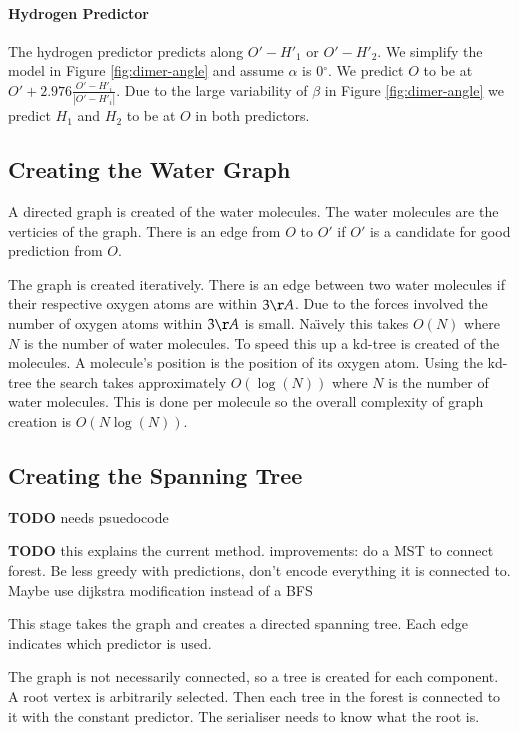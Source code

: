 \documentclass{report}
\newcommand{\degree}{\ensuremath{^\circ}}
\newcommand{\todo}{\textbf{TODO} }
\begin{document}
\paragraph{Hydrogen Predictor}
The hydrogen predictor predicts along $O'-H'_1$ or $O'-H'_2$. We simplify the
model in Figure \ref{fig:dimer-angle} and assume $\alpha$ is $0\degree$. We
predict $O$ to be at $O' + 2.976\frac{O'-H'_i}{|O'-H'_i|}$. Due to the large
variability of $\beta$ in Figure \ref{fig:dimer-angle} we predict $H_1$ and
$H_2$ to be at $O$ in both predictors.


\subsection{Creating the Water Graph}

A directed graph is created of the water molecules. The water molecules are
the verticies of the graph. There is an edge from $O$ to $O'$ if $O'$ is a
candidate for good prediction from $O$.

The graph is created iteratively. There is an edge between two water molecules
if their respective oxygen atoms are within $3\AA$. Due to the forces involved
the number of oxygen atoms within $3\AA$ is small. Na\"{\i}vely this takes
$O(N)$ where $N$ is the number of water molecules. To speed this up a kd-tree
is created of the molecules. A molecule's position is the position of its
oxygen atom. Using the kd-tree the search takes approximately $O(\log(N))$
where $N$ is the number of water molecules. This is done per molecule so the
overall complexity of graph creation is $O(N\log(N))$.


\subsection{Creating the Spanning Tree}

\todo needs psuedocode

\todo this explains the current method. improvements: do a MST to connect
forest. Be less greedy with predictions, don't encode everything it is
connected to. Maybe use dijkstra modification instead of a BFS

This stage takes the graph and creates a directed spanning tree. Each edge
indicates which predictor is used.

The graph is not necessarily connected, so a tree is created for each
component. A root vertex is arbitrarily selected. Then each tree in the forest
is connected to it with the constant predictor. The serialiser needs to know
what the root is.
\end{document}
